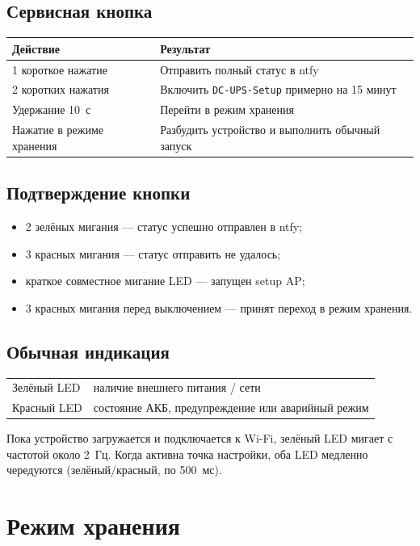 \documentclass[10.5pt,a5paper]{article}
\begin{document}
\subsection{Сервисная кнопка}
\begin{tabularx}{\textwidth}{@{}p{35mm}X@{}}
\toprule
\textbf{Действие} & \textbf{Результат} \\
\midrule
1 короткое нажатие & Отправить полный статус в ntfy \\
2 коротких нажатия & Включить \texttt{DC-UPS-Setup} примерно на 15 минут \\
Удержание 10~с & Перейти в режим хранения \\
Нажатие в режиме хранения& Разбудить устройство и выполнить обычный запуск \\
\bottomrule
\end{tabularx}

\subsection{Подтверждение кнопки}
\begin{itemize}
  \item 2 зелёных мигания --- статус успешно отправлен в ntfy;
  \item 3 красных мигания --- статус отправить не удалось;
  \item краткое совместное мигание LED --- запущен setup AP;
  \item 3 красных мигания перед выключением --- принят переход в режим хранения.
\end{itemize}

\subsection{Обычная индикация}
\begin{tabularx}{\textwidth}{@{}p{35mm}X@{}}
\toprule
Зелёный LED & наличие внешнего питания / сети \\
Красный LED & состояние АКБ, предупреждение или аварийный режим \\
\bottomrule
\end{tabularx}

Пока устройство загружается и подключается к Wi-Fi, зелёный LED мигает с частотой около 2~Гц. Когда активна точка настройки, оба LED медленно чередуются (зелёный/красный, по 500~мс).

\section{Режим хранения}
\end{document}
